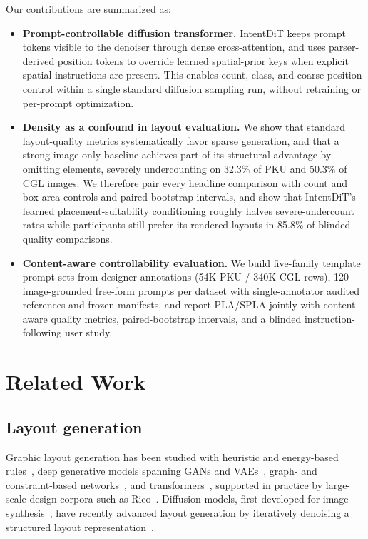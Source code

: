 \documentclass[review]{elsarticle}
\begin{document}
Our contributions are summarized as:
\begin{itemize}
  \item \textbf{Prompt-controllable diffusion transformer.}
  IntentDiT keeps prompt tokens visible to the denoiser through dense cross-attention, and uses parser-derived position tokens to override learned spatial-prior keys when explicit spatial instructions are present.
  This enables count, class, and coarse-position control within a single standard diffusion sampling run, without retraining or per-prompt optimization.

  \item \textbf{Density as a confound in layout evaluation.} We show that standard layout-quality metrics systematically favor sparse generation, and that a strong image-only baseline achieves part of its structural advantage by omitting elements, severely undercounting on 32.3\% of PKU and 50.3\% of CGL images. We therefore pair every headline comparison with count and box-area controls and paired-bootstrap intervals, and show that IntentDiT's learned placement-suitability conditioning roughly halves severe-undercount rates while participants still prefer its rendered layouts in 85.8\% of blinded quality comparisons.

  \item \textbf{Content-aware controllability evaluation.}
  We build five-family template prompt sets from designer annotations (54K PKU / 340K CGL rows), 120 image-grounded free-form prompts per dataset with single-annotator audited references and frozen manifests, and report PLA/SPLA jointly with content-aware quality metrics, paired-bootstrap intervals, and a blinded instruction-following user study.
\end{itemize}

\section{Related Work}
\label{sec:related}
\subsection{Layout generation}
Graphic layout generation has been studied with heuristic and energy-based rules~\cite{ODonovan14}, deep generative models spanning GANs and VAEs~\cite{Goodfellow14,Kingma13,Zheng19,Li19,Jyothi19}, graph- and constraint-based networks~\cite{Lee20}, and transformers~\cite{Vaswani17,Gupta21}, supported in practice by large-scale design corpora such as Rico~\cite{Deka17}. Diffusion models, first developed for image synthesis~\cite{Ho20,Ramesh21,Rombach22}, have recently advanced layout generation by iteratively denoising a structured layout representation~\cite{Inoue23,Li23RADM}.
\end{document}
